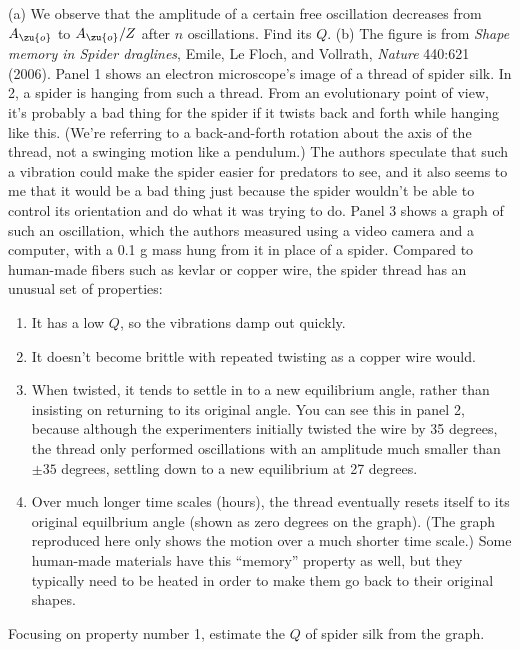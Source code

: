 (a) We observe that the amplitude of a certain free oscillation decreases from $A_\zu{o}$ to $A_\zu{o}/Z$ after $n$ oscillations.
Find its $Q$.\answercheck\hwendpart
(b) The figure is from
\emph{Shape memory in Spider draglines}, Emile, Le Floch, and Vollrath, \emph{Nature} 440:621 (2006).
Panel 1 shows an electron microscope's image of a thread of spider silk.
In 2, a spider is hanging from such a thread. From an evolutionary point of
view, it's probably a bad thing for the spider if it twists back and forth while hanging
like this. (We're referring to a back-and-forth rotation about the axis of the thread, not
a swinging motion like a pendulum.) The authors speculate that such a vibration could make the spider easier for predators to see,
and it also seems to me that it would be a bad thing just because the spider wouldn't be able
to control its orientation and do what it was trying to do. Panel 3 shows a graph of such an oscillation, which
the authors measured using a video camera and a computer, with a 0.1 g mass hung from it in place of
a spider. Compared to human-made fibers such as kevlar or copper wire, the spider thread has an
unusual set of properties:
\begin{enumerate}
\item It has a low $Q$, so the vibrations damp out quickly. 
\item It doesn't become brittle with repeated twisting as a copper wire would.
\item When twisted, it tends to settle in to a new equilibrium angle, rather than
        insisting on returning to its original angle. You can see this in 
        panel 2, because although the experimenters initially
        twisted the wire by 35 degrees, the thread only performed oscillations with an amplitude
        much smaller than $\pm35$ degrees, settling down to a new equilibrium at 27 degrees.
\item Over much longer time scales (hours), the thread eventually resets itself to its original
        equilbrium angle (shown as zero degrees on the graph). (The graph reproduced here only
        shows the motion over a much shorter time scale.) Some human-made materials have this
        ``memory'' property as well, but they typically need to be heated in order to make them
        go back to their original shapes.
\end{enumerate}
Focusing on property number 1, estimate the $Q$ of spider silk from the graph.\answercheck
